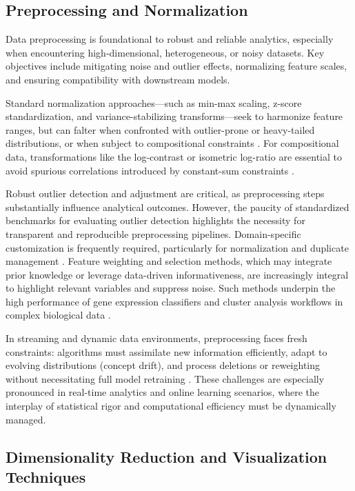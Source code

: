 \documentclass[sigconf]{acmart}
\begin{document}
\subsection{Preprocessing and Normalization}

Data preprocessing is foundational to robust and reliable analytics, especially when encountering high-dimensional, heterogeneous, or noisy datasets. Key objectives include mitigating noise and outlier effects, normalizing feature scales, and ensuring compatibility with downstream models.

Standard normalization approaches—such as min-max scaling, z-score standardization, and variance-stabilizing transforms—seek to harmonize feature ranges, but can falter when confronted with outlier-prone or heavy-tailed distributions, or when subject to compositional constraints \cite{ref60,ref65,ref66,ref67}. For compositional data, transformations like the log-contrast or isometric log-ratio are essential to avoid spurious correlations introduced by constant-sum constraints \cite{ref92,ref95}.

Robust outlier detection and adjustment are critical, as preprocessing steps substantially influence analytical outcomes. However, the paucity of standardized benchmarks for evaluating outlier detection highlights the necessity for transparent and reproducible preprocessing pipelines. Domain-specific customization is frequently required, particularly for normalization and duplicate management \cite{ref73,ref74,ref76,ref77,ref78,ref92,ref95}. Feature weighting and selection methods, which may integrate prior knowledge or leverage data-driven informativeness, are increasingly integral to highlight relevant variables and suppress noise. Such methods underpin the high performance of gene expression classifiers and cluster analysis workflows in complex biological data \cite{ref116}.

In streaming and dynamic data environments, preprocessing faces fresh constraints: algorithms must assimilate new information efficiently, adapt to evolving distributions (concept drift), and process deletions or reweighting without necessitating full model retraining \cite{ref76,ref79,ref80,ref86,ref94}. These challenges are especially pronounced in real-time analytics and online learning scenarios, where the interplay of statistical rigor and computational efficiency must be dynamically managed.

\subsection{Dimensionality Reduction and Visualization Techniques}
\end{document}
